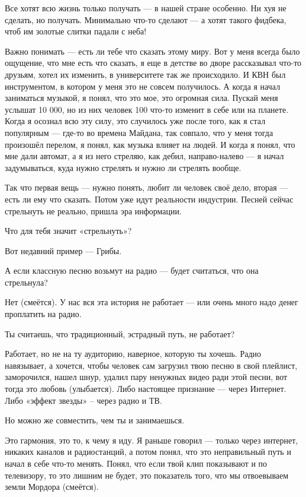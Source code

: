 Все хотят всю жизнь только получать --- в нашей стране особенно. Ни хуя не
сделать, но получать. Минимально что-то сделают --- а хотят такого фидбека, чтоб
им золотые слитки падали с неба!

Важно понимать --- есть ли тебе что сказать этому миру. Вот у меня всегда было
ощущение, что мне есть что сказать, я еще в детстве во дворе рассказывал что-то
друзьям, хотел их изменить, в университете так же происходило. И КВН был
инструментом, в котором у меня это не совсем получилось. А когда я начал
заниматься музыкой, я понял, что это мое, это огромная сила. Пускай меня
услышат 10 000, но из них человек 100 что-то изменит в себе или на планете.
Когда я осознал всю эту силу, это случилось уже после того, как я стал
популярным --- где-то во времена Майдана, так совпало, что у меня тогда произошёл
перелом, я понял, как музыка влияет на людей. И когда я понял, что мне дали
автомат, а я из него стреляю, как дебил, направо-налево --- я начал задумываться,
куда нужно стрелять и нужно ли стрелять вообще.

Так что первая вещь --- нужно понять, любит ли человек своё дело, вторая --- есть
ли ему что сказать. Потом уже идут реальности индустрии. Песней сейчас
стрельнуть не реально, пришла эра информации.

Что для тебя значит «стрельнуть»?

Вот недавний пример --- Грибы.

А если классную песню возьмут на радио --- будет считаться, что она стрельнула?

Нет (смеётся). У нас вся эта история не работает --- или очень много надо денег
проплатить на радио.

Ты считаешь, что традиционный, эстрадный путь, не работает?

Работает, но не на ту аудиторию, наверное, которую ты хочешь. Радио навязывает,
а хочется, чтобы человек сам загрузил твою песню в свой плейлист, заморочился,
нашел шнур, удалил пару ненужных видео ради этой песни, вот тогда это любовь
(улыбается). Либо настоящее признание --- через Интернет. Либо «эффект звезды» –
через радио и ТВ.

Но можно же совместить, чем ты и занимаешься.

Это гармония, это то, к чему я иду. Я раньше говорил --- только через интернет,
никаких каналов и радиостанций, а потом понял, что это неправильный путь и
начал в себе что-то менять. Понял, что если твой клип показывают и по
телевизору, то это лишним не будет, это показатель того, что мы отвоевываем
земли Мордора (смеётся).

